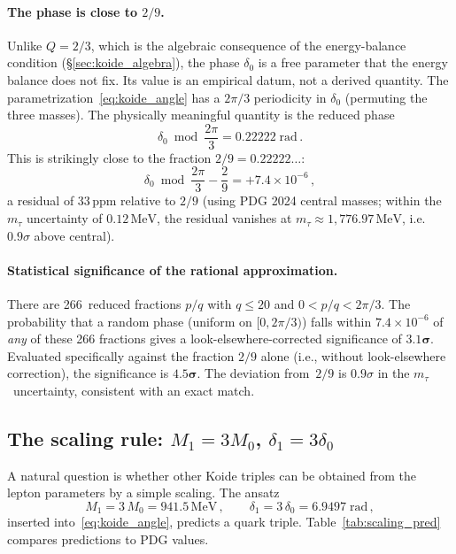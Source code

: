 \documentclass[12pt,a4paper]{article}
\newcommand{\MeV}{\,\text{MeV}}
\begin{document}
\paragraph{The phase is close to $2/9$.}
Unlike $Q = 2/3$, which is the algebraic consequence of the
energy-balance condition (\S\ref{sec:koide_algebra}), the phase
$\delta_0$ is a free parameter that the energy balance does
not fix. Its value is an empirical datum, not a derived quantity.
The parametrization~\eqref{eq:koide_angle} has a $2\pi/3$ periodicity
in $\delta_0$ (permuting the three masses). The physically
meaningful quantity is the reduced phase
\begin{equation}
\delta_0 \bmod \frac{2\pi}{3} = 0.22222\;\text{rad}\,.
\end{equation}
This is strikingly close to the fraction $2/9 = 0.22222\ldots$:
\begin{equation}
\delta_0 \bmod \frac{2\pi}{3} - \frac{2}{9} = +7.4 \times 10^{-6}\,,
\end{equation}
a residual of $33\,\text{ppm}$ relative to $2/9$
(using PDG 2024 central masses; within the $m_\tau$ uncertainty
of $0.12\MeV$, the residual vanishes at $m_\tau \approx 1{,}776.97\MeV$,
i.e.\ $0.9\sigma$ above central).

\paragraph{Statistical significance of the rational approximation.}
There are 266~reduced fractions $p/q$ with $q \leq 20$ and
$0 < p/q < 2\pi/3$. The probability that a random phase (uniform
on $[0, 2\pi/3)$) falls within $7.4 \times 10^{-6}$ of \emph{any}
of these 266 fractions gives a look-elsewhere-corrected significance
of $\mathbf{3.1\sigma}$. Evaluated specifically against the fraction
$2/9$ alone (i.e., without look-elsewhere correction), the
significance is $\mathbf{4.5\sigma}$.
The deviation from~$2/9$ is $0.9\sigma$ in the
$m_\tau$~uncertainty, consistent with an exact match.

\subsection{The scaling rule: $M_1 = 3M_0$, $\delta_1 = 3\delta_0$}
\label{subsec:scaling}

A natural question is whether other Koide triples can be obtained
from the lepton parameters by a simple scaling. The ansatz
\begin{equation}
M_1 = 3\,M_0 = 941.5\MeV\,, \qquad
\delta_1 = 3\,\delta_0 = 6.9497\;\text{rad}\,,
\end{equation}
inserted into~\eqref{eq:koide_angle}, predicts a quark triple.
Table~\ref{tab:scaling_pred} compares predictions to PDG values.
\end{document}
